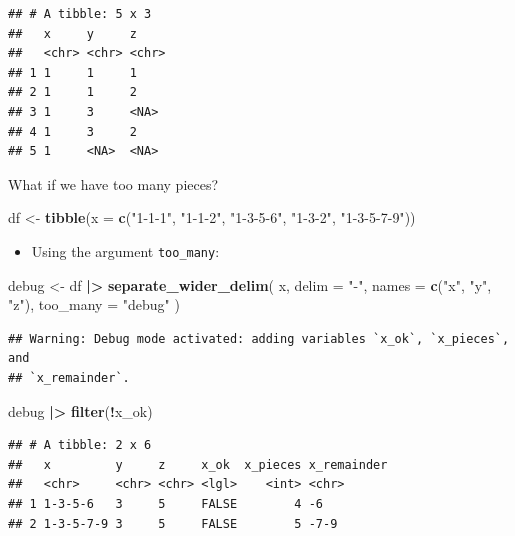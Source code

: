 \documentclass[
]{article}
\newenvironment{Shaded}{\begin{snugshade}}{\end{snugshade}}
\newcommand{\AttributeTok}[1]{\textcolor[rgb]{0.13,0.29,0.53}{#1}}
\newcommand{\FunctionTok}[1]{\textcolor[rgb]{0.13,0.29,0.53}{\textbf{#1}}}
\newcommand{\NormalTok}[1]{#1}
\newcommand{\OtherTok}[1]{\textcolor[rgb]{0.56,0.35,0.01}{#1}}
\newcommand{\SpecialCharTok}[1]{\textcolor[rgb]{0.81,0.36,0.00}{\textbf{#1}}}
\newcommand{\StringTok}[1]{\textcolor[rgb]{0.31,0.60,0.02}{#1}}
\providecommand{\tightlist}{%
  \setlength{\itemsep}{0pt}\setlength{\parskip}{0pt}}
\begin{document}
\begin{verbatim}
## # A tibble: 5 x 3
##   x     y     z    
##   <chr> <chr> <chr>
## 1 1     1     1    
## 2 1     1     2    
## 3 1     3     <NA> 
## 4 1     3     2    
## 5 1     <NA>  <NA>
\end{verbatim}

What if we have too many pieces?

\begin{Shaded}
\begin{Highlighting}[]
\NormalTok{df }\OtherTok{\textless{}{-}} \FunctionTok{tibble}\NormalTok{(}\AttributeTok{x =} \FunctionTok{c}\NormalTok{(}\StringTok{"1{-}1{-}1"}\NormalTok{, }\StringTok{"1{-}1{-}2"}\NormalTok{, }\StringTok{"1{-}3{-}5{-}6"}\NormalTok{, }\StringTok{"1{-}3{-}2"}\NormalTok{, }\StringTok{"1{-}3{-}5{-}7{-}9"}\NormalTok{))}
\end{Highlighting}
\end{Shaded}

\begin{itemize}
\tightlist
\item
  Using the argument \texttt{too\_many}:
\end{itemize}

\begin{Shaded}
\begin{Highlighting}[]
\NormalTok{debug }\OtherTok{\textless{}{-}}\NormalTok{ df }\SpecialCharTok{|\textgreater{}} 
  \FunctionTok{separate\_wider\_delim}\NormalTok{(}
\NormalTok{    x,}
    \AttributeTok{delim =} \StringTok{"{-}"}\NormalTok{,}
    \AttributeTok{names =} \FunctionTok{c}\NormalTok{(}\StringTok{"x"}\NormalTok{, }\StringTok{"y"}\NormalTok{, }\StringTok{"z"}\NormalTok{),}
    \AttributeTok{too\_many =} \StringTok{"debug"}
\NormalTok{  )}
\end{Highlighting}
\end{Shaded}

\begin{verbatim}
## Warning: Debug mode activated: adding variables `x_ok`, `x_pieces`, and
## `x_remainder`.
\end{verbatim}

\begin{Shaded}
\begin{Highlighting}[]
\NormalTok{debug }\SpecialCharTok{|\textgreater{}} \FunctionTok{filter}\NormalTok{(}\SpecialCharTok{!}\NormalTok{x\_ok)}
\end{Highlighting}
\end{Shaded}

\begin{verbatim}
## # A tibble: 2 x 6
##   x         y     z     x_ok  x_pieces x_remainder
##   <chr>     <chr> <chr> <lgl>    <int> <chr>      
## 1 1-3-5-6   3     5     FALSE        4 -6         
## 2 1-3-5-7-9 3     5     FALSE        5 -7-9
\end{verbatim}
\end{document}
